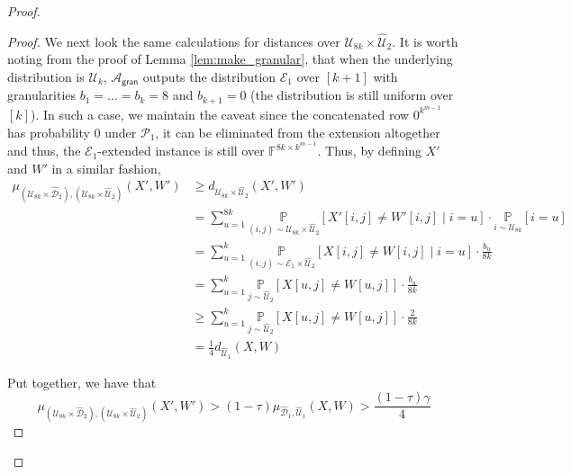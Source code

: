 \documentclass[10pt,a4paper]{article}
\newcommand{\gran}{\mathsf{gran}}
\newcommand{\F}{\mathbb{F}}
\newcommand{\sU}{\mathcal{U}}
\newcommand{\sD}{\mathcal{D}}
\newcommand{\sA}{\mathcal{A}}
\newcommand{\sP}{\mathcal{P}}
\begin{document}
\begin{proof}
\begin{proof}
    We next look the same calculations for distances over $\sU_{8k} \times \widehat{\sU}_{2}$. It is worth noting from the proof of Lemma \ref{lem:make_granular}, that when the underlying distribution is $\sU_k$, $\sA_\gran$ outputs the distribution $\mathcal{E}_{1}$ over $[k+1]$ with granularities $b_1 = \dots = b_k = 8$ and $b_{k+1} = 0$ (the distribution is still uniform over $[k]$). In such a case, we maintain the caveat since the concatenated row $0^{k^{m-1}}$ has probability $0$ under $\sP_1$, it can be eliminated from the extension altogether and thus, the $\mathcal{E}_1$-extended instance is still over $\F^{8k \times k^{m-1}}$. Thus, by defining $X'$ and $W'$ in a similar fashion, 
    \begin{equation*}
        \begin{split}
            \mu_{(\sU_{8k} \times \widehat{\sD}_{2}), (\sU_{8k} \times \widehat{\sU}_{2})} (X', W') &\geq d_{\sU_{8k} \times \widehat{\sU}_{2}} (X', W') \\
             &= \sum_{u=1}^{8k} \underset{(i,j) \sim \sU_{8k} \times \widehat{\sU}_{2}}{\mathbb{P}} \left[ X'[i,j] \neq W'[i,j] \mid i = u \right] \cdot \underset{i \sim \sU_{8k}}{\mathbb{P}} [i=u]\\
            &= \sum_{u=1}^{k} \underset{(i,j) \sim \mathcal{E}_{1} \times \widehat{\sU}_{2}}{\mathbb{P}} \left[ X[i,j] \neq W[i,j] \mid i = u \right] \cdot \frac{b_{u}}{8k}\\
            &= \sum_{u=1}^{k} \underset{j \sim \widehat{\sU}_{2}}{\mathbb{P}} \left[ X[u,j] \neq W[u,j] \right] \cdot \frac{b_{u}}{8k}\\
            &\geq \sum_{u=1}^{k} \underset{j \sim \widehat{\sU}_{2}}{\mathbb{P}} \left[ X[u,j] \neq W[u,j] \right] \cdot \frac{2}{8k}\\
            &= \frac{1}{4}d_{\widehat{\sU}_{1}}(X, W)
        \end{split}
    \end{equation*}

    Put together, we have that 
    \begin{equation}
    \label{eq:gran_lb}
        \mu_{(\sU_{8k} \times \widehat{\sD}_{2}), (\sU_{8k} \times \widehat{\sU}_{2})} (X', W') > (1-\tau)\mu_{\widehat{\sD}_{1},\widehat{\sU}_{1}} (X, W)> \frac{(1-\tau)\gamma}{4}
    \end{equation}


\end{proof}
\end{proof}
\end{document}
